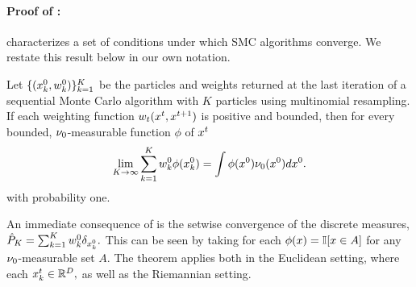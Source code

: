 %

\paragraph{Proof of :}
 characterizes a set of conditions under which SMC algorithms converge.
We restate this result below in our own notation.
\begin{theorem}\label{thm:chopin_theorem}
Let $\{(x_k^{0}, w_k^{0})\}_{k=1}^K$ be the particles and weights returned at the last iteration of a sequential Monte Carlo algorithm with $K$ particles using multinomial resampling.
If each weighting function $w_t(x^{t}, x^{t+1})$ is positive and bounded, 
then for every bounded, $\nu_0$-measurable function $\phi$ of $x^{t}$
$$
\lim_{K\rightarrow \infty} \sum_{k=1}^K w_k^{0} \phi(x_k^{0})
=
\int \phi(x^{0})\nu_0(x^{0})dx^{0}.
$$
with probability one.
\end{theorem}


An immediate consequence of  is the setwise convergence of the discrete measures, $\hat P_K = \sum_{k=1}^K w_k^{0} \delta_{x_k^{0}}.$
This can be seen by taking for each $\phi(x) = \mathbb{I}[x \in A]$ for any $\nu_0$-measurable set $A$.
The theorem applies both in the Euclidean setting, where each $x_k^{t}\in \mathbb{R}^D,$ as well as the Riemannian setting.

